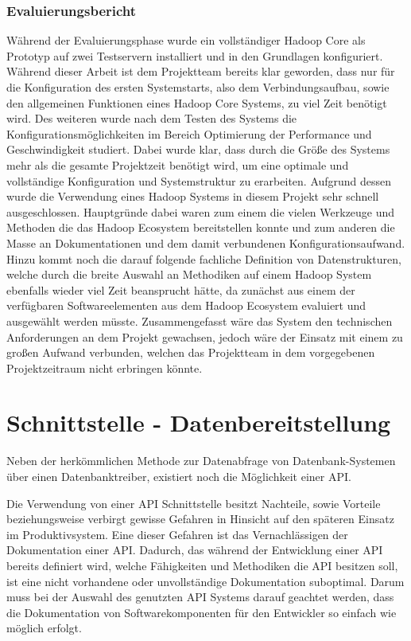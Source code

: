 \subsubsection{Evaluierungsbericht}
\label{subsubsec:hadoop_hive_impala_evaluierung}
Während der Evaluierungsphase wurde ein vollständiger Hadoop Core als Prototyp
auf zwei Testservern installiert und in den Grundlagen konfiguriert. Während
dieser Arbeit ist dem Projektteam bereits klar geworden, dass nur für die
Konfiguration des ersten Systemstarts, also dem Verbindungsaufbau, sowie den
allgemeinen Funktionen eines Hadoop Core Systems, zu viel Zeit benötigt wird.
Des weiteren wurde nach dem Testen des Systems die Konfigurationsmöglichkeiten
im Bereich Optimierung der Performance und Geschwindigkeit studiert. Dabei
wurde klar, dass durch die Größe des Systems mehr als die gesamte Projektzeit
benötigt wird, um eine optimale und vollständige Konfiguration und
Systemstruktur zu erarbeiten. Aufgrund dessen wurde die Verwendung eines Hadoop
Systems in diesem Projekt sehr schnell ausgeschlossen. Hauptgründe dabei waren
zum einem die vielen Werkzeuge und Methoden die das Hadoop Ecosystem
bereitstellen konnte und zum anderen die Masse an Dokumentationen und dem damit
verbundenen Konfigurationsaufwand. Hinzu kommt noch die darauf folgende
fachliche Definition von Datenstrukturen, welche durch die breite Auswahl an
Methodiken auf einem Hadoop System ebenfalls wieder viel Zeit beansprucht
hätte, da zunächst aus einem der verfügbaren Softwareelementen aus dem Hadoop
Ecosystem evaluiert und ausgewählt werden müsste. Zusammengefasst wäre das
System den technischen Anforderungen an dem Projekt gewachsen, jedoch wäre der
Einsatz mit einem zu großen Aufwand verbunden, welchen das Projektteam in dem
vorgegebenen Projektzeitraum nicht erbringen könnte.
\nl%

\section{Schnittstelle - Datenbereitstellung}
\label{sec:schnittstelle_datenbereitstellung}
Neben der herkömmlichen Methode zur Datenabfrage von Datenbank-Systemen über
einen Datenbanktreiber, existiert noch die Möglichkeit einer API\@.

Die Verwendung von einer API Schnittstelle besitzt Nachteile, sowie Vorteile
beziehungsweise verbirgt gewisse Gefahren in Hinsicht auf den späteren Einsatz
im Produktivsystem. Eine dieser Gefahren ist das Vernachlässigen der
Dokumentation einer API\@. Dadurch, das während der Entwicklung einer API
bereits definiert wird, welche Fähigkeiten und Methodiken die API besitzen
soll, ist eine nicht vorhandene oder unvollständige Dokumentation suboptimal.
Darum muss bei der Auswahl des genutzten API Systems darauf geachtet werden,
dass die Dokumentation von Softwarekomponenten für den Entwickler so einfach
wie möglich erfolgt.

